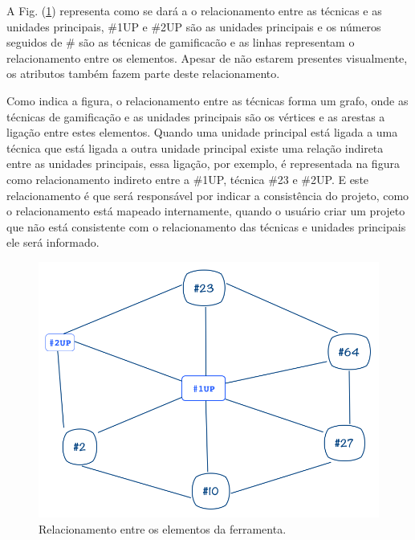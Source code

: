 A Fig. (\ref{fig05}) representa como se dará a o relacionamento entre as técnicas e as unidades principais, \#1UP e \#2UP são as unidades principais e os números seguidos de \# são as técnicas de gamificacão e as linhas representam o relacionamento entre os elementos. Apesar de não estarem presentes visualmente, os atributos também fazem parte deste relacionamento.

Como indica a figura, o relacionamento entre as técnicas forma um grafo, onde as técnicas de gamificação e as unidades principais são os vértices e as arestas a ligação entre estes elementos. Quando uma unidade principal está ligada a uma técnica que está ligada a outra unidade principal existe uma relação indireta entre as unidades principais, essa ligação, por exemplo, é representada na figura como relacionamento indireto entre a \#1UP, técnica \#23 e \#2UP. E este relacionamento é que será responsável por indicar a consistência do projeto, como o relacionamento está mapeado internamente, quando o usuário criar um projeto que não está consistente com o relacionamento das técnicas e unidades principais ele será informado.

\begin{figure}[h]
	\centering
		\includegraphics[keepaspectratio=true,scale=0.5]{figuras/grafo.png}
	\caption{Relacionamento entre os elementos da ferramenta.\label{fig05}}
\end{figure}



